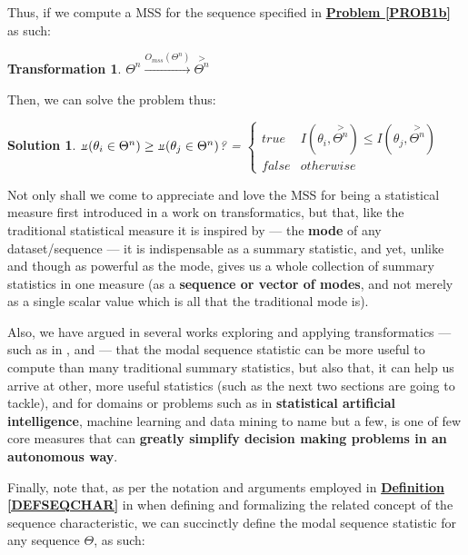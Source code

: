 \documentclass[a4paper, 18pt]{book} %
\newtheorem{trans}{Transformation}
\newtheorem{soln}{Solution}
\newcommand{\invpi}{\rotatebox[origin=c]{180}{$\pi$}}
\begin{document}
Thus, if we compute a MSS for the sequence specified in \textbf{\hyperref[PROB1b]{Problem \ref{PROB1b}}} as such:

\vspace{1em}
\begin{trans}
$\Theta^n \xrightarrow{O_{mss}(\Theta^n)} \overset{>}{\Theta^n}$
\end{trans}
\vspace{1em}

Then, we can solve the problem thus:

\vspace{1em}
\begin{soln}
\label{SOLN1b}
$\invpi(\theta_i \in \Theta^n) \geq \invpi(\theta_j \in \Theta^n)$? = 
$\begin{cases}
true & I(\theta_i,\overset{>}{\Theta^n}) \leq I(\theta_j,\overset{>}{\Theta^n})\\
false & otherwise
\end{cases}$
\end{soln}
\vspace{1em}


Not only shall we come to appreciate and love the MSS for being a statistical measure first introduced in a work on transformatics\cite{transformatics}, but that, like the traditional statistical measure it is inspired by --- the \textbf{mode} of any dataset/sequence --- it is indispensable as a summary statistic, and yet, unlike and though as powerful as the mode, gives us a whole collection of summary statistics in one measure (as a \textbf{sequence or vector of modes}, and not merely as a single scalar value which is all that the traditional mode is). 

Also, we have argued in several works exploring and applying transformatics --- such as in \cite{transformatics}, \cite{adtpaper} and \cite{lutalo_2025_trans_genetics} --- that the modal sequence statistic can be more useful to compute than many traditional summary statistics, but also that, it can help us arrive at other, more useful statistics (such as the next two sections are going to tackle), and for domains or problems such as in \textbf{statistical artificial intelligence}, machine learning and data mining to name but a few, is one of few core measures that can \textbf{greatly simplify decision making problems in an autonomous way}.



Finally, note that, as per the notation and arguments employed in \textbf{\hyperref[DEFSEQCHAR]{Definition \ref{DEFSEQCHAR}}} in \cite{lutalo_2025_trans_genetics} when defining and formalizing the related concept of the sequence characteristic, we can succinctly define the modal sequence statistic for any sequence $\Theta$, as such:
\end{document}
